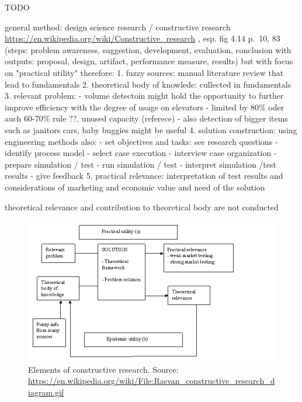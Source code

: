TODO




general method:
design science research / constructive research
\url{https://en.wikipedia.org/wiki/Constructive_research}
\autocite[][pp.67--100]{dresh2015designresearch}, esp. fig 4.14 p.~10, 83 (steps: problem awareness, suggestion, development, evaluation, conclusion with outputs: proposal, design, artifact, performance measure, results)
but with focus on "practical utility"
therefore:
1. fuzzy sources: manual literature review that lead to fundamentals
2. theoretical body of knowlede: cullected in fundamentals
3. relevant problem: 
    - volume detectoin might hold the opportunity to further improve efficiency with the degree of usage on elevators
    - limited by 80\% oder auch 60-70\% rule \autocite[][p.~194]{unger2015aufzuege} ??, unused capacity (referece)
    - also detection of bigger items such as janitors cars, baby buggies  might be useful
4. solution construction: using engineering methods
    also:    
    - set objectives and tasks: see research questions
    - identify process model
    - select case execution
    - interview case organization
    - prepare simulation / test
    - run simulation / test
    - interpret simulation /test results
    - give feedback
5. practical relevance: interpretation of test results and considerations of marketing and economic value and need of the solution

theoretical relevance and contribution to theoretical body are not conducted

\begin{figure}[hbt]
	\centering
	\includegraphics[width=1.0\textwidth, keepaspectratio]{resources/Rasvan_constructive_research_diagram}
	\caption{\label{fig:design:constructiveresearch} Elements of constructive research. Source:
	\url{https://en.wikipedia.org/wiki/File:Rasvan_constructive_research_diagram.gif}}
\end{figure}


